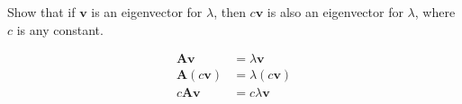 Show that if $\boldsymbol{v}$ is an eigenvector for $\lambda$, then $c\boldsymbol{v}$ is also an eigenvector for $\lambda$, where $c$ is any constant.

\begin{solution}
    \begin{align*}
        \boldsymbol{Av} &= \lambda\boldsymbol{v} \\
        \boldsymbol{A}(c\boldsymbol{v}) &= \lambda(c\boldsymbol{v}) \\
        c\boldsymbol{Av} &= c\lambda\boldsymbol{v}
    \end{align*}
\end{solution}
